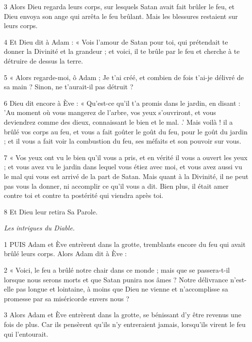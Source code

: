 \par 3 Alors Dieu regarda leurs corps, sur lesquels Satan avait fait brûler le feu, et Dieu envoya son ange qui arrêta le feu brûlant. Mais les blessures restaient sur leurs corps.

\par 4 Et Dieu dit à Adam : « Vois l'amour de Satan pour toi, qui prétendait te donner la Divinité et la grandeur ; et voici, il te brûle par le feu et cherche à te détruire de dessus la terre.

\par 5 « Alors regarde-moi, ô Adam ; Je t'ai créé, et combien de fois t'ai-je délivré de sa main ? Sinon, ne t’aurait-il pas détruit ?

\par 6 Dieu dit encore à Ève : « Qu'est-ce qu'il t'a promis dans le jardin, en disant : 'Au moment où vous mangerez de l'arbre, vos yeux s'ouvriront, et vous deviendrez comme des dieux, connaissant le bien et le mal. .' Mais voilà ! il a brûlé vos corps au feu, et vous a fait goûter le goût du feu, pour le goût du jardin ; et il vous a fait voir la combustion du feu, ses méfaits et son pouvoir sur vous.

\par 7 « Vos yeux ont vu le bien qu'il vous a pris, et en vérité il vous a ouvert les yeux ; et vous avez vu le jardin dans lequel vous étiez avec moi, et vous avez aussi vu le mal qui vous est arrivé de la part de Satan. Mais quant à la Divinité, il ne peut pas vous la donner, ni accomplir ce qu'il vous a dit. Bien plus, il était amer contre toi et contre ta postérité qui viendra après toi.

\par 8 Et Dieu leur retira Sa Parole.


\par \textit{Les intrigues du Diable.}

\par 1 PUIS Adam et Ève entrèrent dans la grotte, tremblants encore du feu qui avait brûlé leurs corps. Alors Adam dit à Ève :

\par 2 « Voici, le feu a brûlé notre chair dans ce monde ; mais que se passera-t-il lorsque nous serons morts et que Satan punira nos âmes ? Notre délivrance n’est-elle pas longue et lointaine, à moins que Dieu ne vienne et n’accomplisse sa promesse par sa miséricorde envers nous ?

\par 3 Alors Adam et Ève entrèrent dans la grotte, se bénissant d'y être revenus une fois de plus. Car ils pensèrent qu'ils n'y entreraient jamais, lorsqu'ils virent le feu qui l'entourait.

